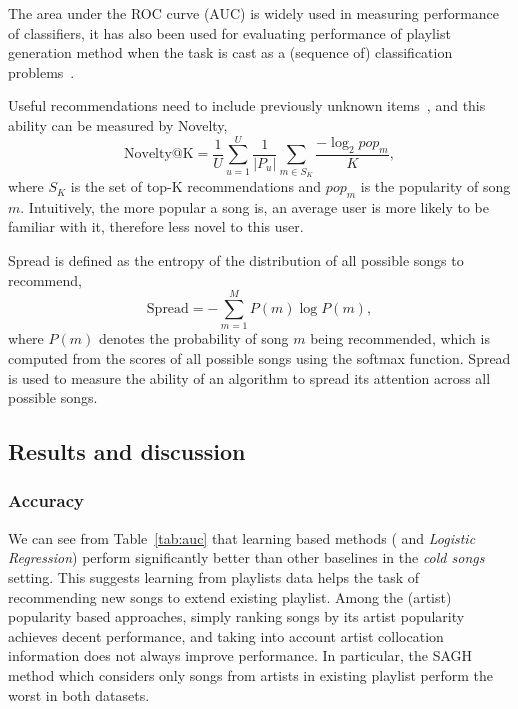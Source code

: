 The area under the ROC curve (AUC) is widely used in measuring performance of classifiers,
it has also been used for evaluating performance of playlist generation method when the task
is cast as a (sequence of) classification problems~\cite{ben2017groove}.

Useful recommendations need to include previously unknown items~\cite{herlocker2004evaluating,zhang2012auralist}, 
and this ability can be measured by Novelty,
$$
\text{Novelty@K} = \frac{1}{U} \sum_{u=1}^U \frac{1}{|P_u|} \sum_{m \in S_K} \frac{-\log_2 pop_m}{K},
$$
where $S_K$ is the set of top-K recommendations and $pop_m$ is the popularity of song $m$.
Intuitively, the more popular a song is, an average user is more likely to be familiar with it,
therefore less novel to this user.

Spread is defined as the entropy of the distribution of all possible songs to recommend,
$$
\text{Spread} = -\sum_{m=1}^M P(m) \log P(m),
$$
where $P(m)$ denotes the probability of song $m$ being recommended,
which is computed from the scores of all possible songs using the softmax function.
Spread is used to measure the ability of an algorithm to spread its attention across all possible songs.



\subsection{Results and discussion}


%

%

\subsubsection{Accuracy}

We can see from Table~\ref{tab:auc} that learning based methods (
and {\it Logistic Regression}) perform significantly better than other baselines in the \emph{cold songs} setting.
This suggests learning from playlists data helps the task of recommending new songs to extend existing playlist.
Among the (artist) popularity based approaches, 
simply ranking songs by its artist popularity achieves decent performance,
and taking into account artist collocation information does not always improve performance.
In particular, the SAGH method which considers only songs from artists in existing playlist
perform the worst in both datasets.

